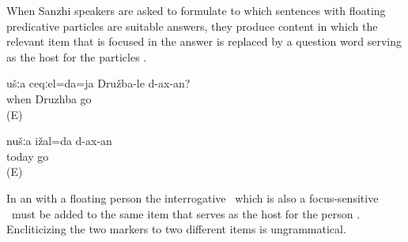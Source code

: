 When Sanzhi speakers are asked to formulate  to which sentences with floating predicative particles are suitable answers, they produce content  in which the relevant item that is focused in the answer is replaced by a question word serving as the host for the particles . 
%
\begin{exe}
	\ex	\label{ex:WHEN will you / do you have to go to Druzhba We will / have to go TODAY@9}
	\begin{xlist}
		\ex	\label{ex:WHEN will you / do you have to go to Druzhba@9a}
		\gll	ušːa	ceqːel=da=ja	Družba-le	d-ax-an?\\
				when	Druzhba	go\\
		\glt	{} (E)

		\ex	\label{ex:We will / have to go TODAY@9b}
		\gll	nušːa	ižal=da	d-ax-an\\
				today	go\\
		\glt	{} (E)
	\end{xlist}
\end{exe}

In an  with a floating person  the interrogative  \tnd\ which is also a focus-sensitive  \tnd\ must be added to the same item that serves as the host for the person . Encliticizing the two markers to two different items  is ungrammatical.
%
\begin{exe}
\end{exe}


